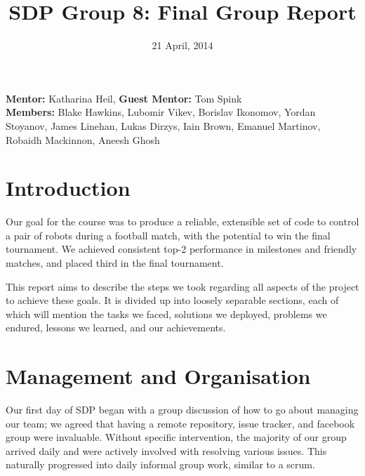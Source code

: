\documentclass[a4paper,11pt]{article}
\title{SDP Group 8: Final Group Report} %
\date{21 April, 2014} %
\begin{document}
\maketitle %

\begin{center}
\textbf{Mentor:} Katharina Heil, \textbf{Guest Mentor:} Tom Spink %
\\
\textbf{Members:} Blake Hawkins, %
Lubomir Vikev,
Borislav Ikonomov,
Yordan Stoyanov,
James Linehan,
Lukas Dirzys,
Iain Brown,
Emanuel Martinov,
Robaidh Mackinnon,
Aneesh Ghosh

\end{center}


\section{Introduction}

Our goal for the course was to produce a reliable, extensible set of code to control a pair of robots during a football match, with the potential to win the final tournament. We achieved consistent top-2 performance in milestones and friendly matches, and placed third in the final tournament. 

This report aims to describe the steps we took regarding all aspects of the project to achieve these goals. It is divided up into loosely separable sections, each of which will mention the tasks we faced, solutions we deployed, problems we endured, lessons we learned, and our achievements. 




\section{Management and Organisation}

Our first day of SDP began with a group discussion of how to go about managing our team; we agreed that having a remote repository, issue tracker, and facebook group were invaluable. Without specific intervention, the majority of our group arrived daily and were actively involved with resolving various issues. This naturally progressed into daily informal group work, similar to a scrum.
\end{document}

